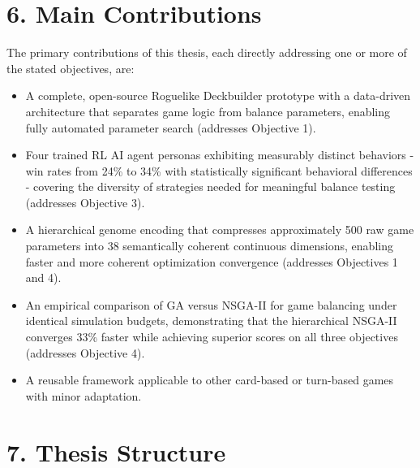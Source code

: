 \section*{6. Main Contributions}

The primary contributions of this thesis, each directly addressing one or more of the stated objectives, are:
\begin{itemize}
    \item A complete, open-source Roguelike Deckbuilder prototype with a data-driven architecture that separates game logic from balance parameters, enabling fully automated parameter search (addresses Objective 1).
    \item Four trained RL AI agent personas exhibiting measurably distinct behaviors - win rates from 24\% to 34\% with statistically significant behavioral differences - covering the diversity of strategies needed for meaningful balance testing (addresses Objective 3).
    \item A hierarchical genome encoding that compresses approximately 500 raw game parameters into 38 semantically coherent continuous dimensions, enabling faster and more coherent optimization convergence (addresses Objectives 1 and 4).
    \item An empirical comparison of GA versus NSGA-II for game balancing under identical simulation budgets, demonstrating that the hierarchical NSGA-II converges 33\% faster while achieving superior scores on all three objectives (addresses Objective 4).
    \item A reusable framework applicable to other card-based or turn-based games with minor adaptation.
\end{itemize}

\section*{7. Thesis Structure}

